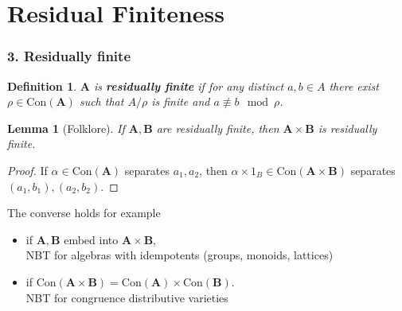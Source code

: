 \documentclass{beamer}
\newtheorem{de}[thm]{Definition}
\newtheorem{lem}[thm]{Lemma}
\theoremstyle{definition}
\newcommand{\Con}{\mathrm{Con}}
\newcommand{\A}{{\mathbf A}}
\newcommand{\B}{{\mathbf B}}
\begin{document}
\section{Residual Finiteness}


\begin{frame}
\frametitle{3. Residually finite}

\begin{de}
 $\A$ is {\bf residually finite} if for any distinct $a,b\in A$ there exist $\rho\in\Con(\A)$
 such that $A/\rho$ is finite and $a\not\equiv b \mod\rho$.
\end{de}
\begin{lem}[Folklore]
 If $\A,\B$ are residually finite, then $\A\times\B$ is residually finite.
\end{lem}

\begin{proof}
 If $\alpha\in\Con(\A)$ separates $a_1,a_2$, then
 $\alpha \times 1_B \in \Con(\A\times\B)$ separates $(a_1,b_1), (a_2,b_2)$.
\end{proof}
\bigskip
 
 The converse holds for example
\begin{itemize}
\item if $\A,\B$ embed into  $\A\times\B$, \\
 {\color{red} NBT for algebras with idempotents (groups, monoids, lattices)}
\item if $\Con(\A\times\B) = \Con(\A)\times\Con(\B)$. \\
 {\color{red} NBT for congruence distributive varieties}
\end{itemize}
\end{frame}
\end{document}
